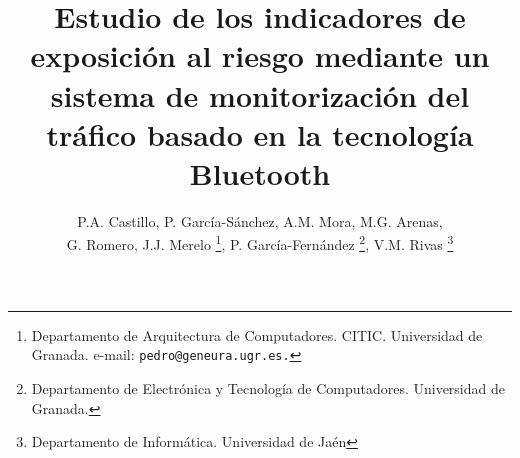 \documentclass[twocolumn,twoside]{Jornadas}
\begin{document}
\title{Estudio de los indicadores de exposición al riesgo mediante un sistema de monitorización del tráfico basado en la tecnología Bluetooth}  

\author{%
	P.A. Castillo, P. García-Sánchez, A.M. Mora, M.G. Arenas, \\ G. Romero, J.J. Merelo
     \thanks{Departamento de Arquitectura de Computadores. CITIC. Universidad de Granada.
	e-mail: {\tt pedro@geneura.ugr.es.}},
	P. García-Fernández
     \thanks{Departamento de Electrónica y Tecnología de Computadores. Universidad de Granada.},
	V.M. Rivas
     \thanks{Departamento de Informática. Universidad de Jaén}
}


\maketitle
\markboth{}{}
\pagestyle{empty} 
\thispagestyle{empty} %
\end{document}
